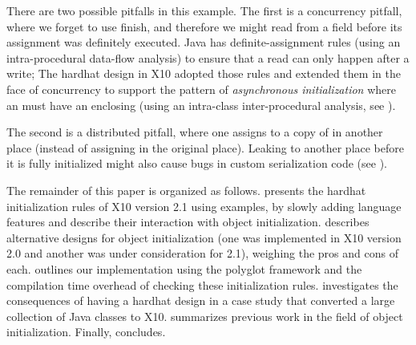 There are two possible pitfalls in this example.
The first is a concurrency pitfall, where we forget to use finish,
    and therefore we might read from a field before its assignment was definitely executed.
Java has definite-assignment rules (using an intra-procedural data-flow analysis)
    to ensure that a read can only happen after a write;
    The hardhat design in X10 adopted those rules
        and extended them in the face of concurrency to support the pattern of
            \emph{asynchronous initialization}
            where an  must have an enclosing 
    (using an intra-class inter-procedural analysis, see ).

The second is a distributed pitfall, where
    one assigns to a copy of \this in another place (instead of assigning in the original place).
Leaking \this to another place before it is fully initialized
    might also cause bugs in custom serialization code (see ).



The remainder of this paper is organized as follows.
 presents the hardhat initialization rules of X10 version 2.1
    using examples,
    by slowly adding language features and describe their interaction with
    object initialization.
 describes alternative designs for object initialization
    (one was implemented in X10 version 2.0 and another was under consideration for 2.1),
    weighing the pros and cons of each.
 outlines our implementation using the polyglot framework
    and the compilation time overhead of checking these initialization rules.
 investigates the consequences of having a hardhat design
    in a case study that converted a large collection of Java classes to X10.
 summarizes previous work in the field of object initialization.
Finally,  concludes.
